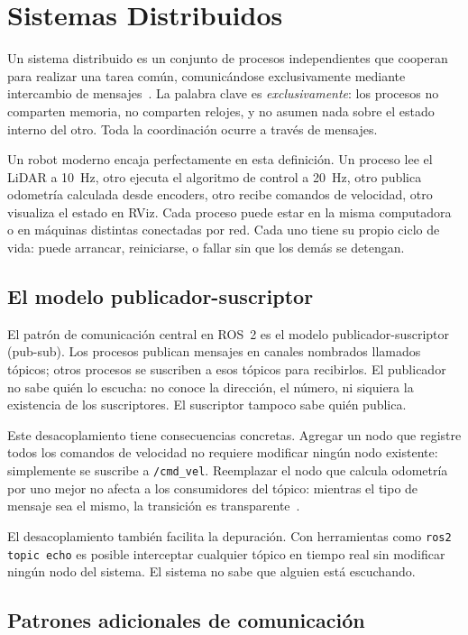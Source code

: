\section{Sistemas Distribuidos}

Un sistema distribuido es un conjunto de procesos independientes que cooperan para realizar una tarea común, comunicándose exclusivamente mediante intercambio de mensajes~\cite{tanenbaum2007distributed}. La palabra clave es \textit{exclusivamente}: los procesos no comparten memoria, no comparten relojes, y no asumen nada sobre el estado interno del otro. Toda la coordinación ocurre a través de mensajes.

Un robot moderno encaja perfectamente en esta definición. Un proceso lee el LiDAR a 10~Hz, otro ejecuta el algoritmo de control a 20~Hz, otro publica odometría calculada desde encoders, otro recibe comandos de velocidad, otro visualiza el estado en RViz. Cada proceso puede estar en la misma computadora o en máquinas distintas conectadas por red. Cada uno tiene su propio ciclo de vida: puede arrancar, reiniciarse, o fallar sin que los demás se detengan.

\subsection{El modelo publicador-suscriptor}

El patrón de comunicación central en ROS~2 es el modelo publicador-suscriptor (pub-sub). Los procesos publican mensajes en canales nombrados llamados tópicos; otros procesos se suscriben a esos tópicos para recibirlos. El publicador no sabe quién lo escucha: no conoce la dirección, el número, ni siquiera la existencia de los suscriptores. El suscriptor tampoco sabe quién publica.

Este desacoplamiento tiene consecuencias concretas. Agregar un nodo que registre todos los comandos de velocidad no requiere modificar ningún nodo existente: simplemente se suscribe a \texttt{/cmd\_vel}. Reemplazar el nodo que calcula odometría por uno mejor no afecta a los consumidores del tópico: mientras el tipo de mensaje sea el mismo, la transición es transparente~\cite{quigley2009ros}.

El desacoplamiento también facilita la depuración. Con herramientas como \texttt{ros2 topic echo} es posible interceptar cualquier tópico en tiempo real sin modificar ningún nodo del sistema. El sistema no sabe que alguien está escuchando.

\subsection{Patrones adicionales de comunicación}

